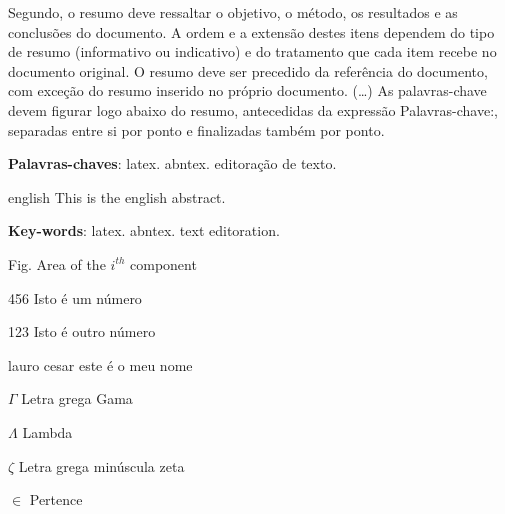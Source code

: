 \documentclass[12pt,oneside,a4paper,english,french,spanish,brazil,]{abntex2}
\begin{document}
\frenchspacing 

\imprimircapa
\imprimirfolhaderosto


\begin{resumo}
 Segundo, o resumo deve ressaltar o
 objetivo, o método, os resultados e as conclusões do documento. A ordem e a extensão
 destes itens dependem do tipo de resumo (informativo ou indicativo) e do
 tratamento que cada item recebe no documento original. O resumo deve ser
 precedido da referência do documento, com exceção do resumo inserido no
 próprio documento. (\ldots) As palavras-chave devem figurar logo abaixo do
 resumo, antecedidas da expressão Palavras-chave:, separadas entre si por
 ponto e finalizadas também por ponto.

 \vspace{\onelineskip}
    
 \noindent
 \textbf{Palavras-chaves}: latex. abntex. editoração de texto.
\end{resumo}

\begin{resumo}[Abstract]
 \begin{otherlanguage*}{english}
   This is the english abstract.

   \vspace{\onelineskip}
 
   \noindent 
   \textbf{Key-words}: latex. abntex. text editoration.
 \end{otherlanguage*}
\end{resumo}

\listoffigures*
\cleardoublepage
{}
\listoftables*
\cleardoublepage
\begin{siglas}
  \item[Fig.] Area of the $i^{th}$ component
  \item[456] Isto é um número
  \item[123] Isto é outro número
  \item[lauro cesar] este é o meu nome
\end{siglas}
\begin{simbolos}
  \item[$ \Gamma $] Letra grega Gama
  \item[$ \Lambda $] Lambda
  \item[$ \zeta $] Letra grega minúscula zeta
  \item[$ \in $] Pertence
\end{simbolos}
\tableofcontents*
\cleardoublepage
\textual
\end{document}
